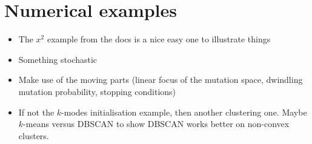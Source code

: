 \documentclass[10pt]{article}
\begin{document}
\section{Numerical examples}\label{section:examples}

\begin{itemize}
    \item The \(x^2\) example from the docs is a nice easy one to illustrate
        things
    \item Something stochastic
    \item Make use of the moving parts (linear focus of the mutation space,
        dwindling mutation probability, stopping conditions)
    \item If not the \(k\)-modes initialisation example, then another clustering
        one. Maybe \(k\)-means versus DBSCAN to show DBSCAN works better on
        non-convex clusters.
\end{itemize}
\end{document}
